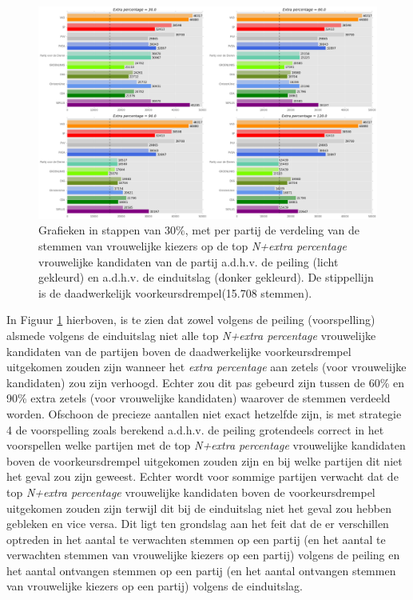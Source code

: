   
\begin{figure}[H]

	\includegraphics[width=\linewidth]	{stemmen_op_vrouwen_topNextrapercentage_samen.png}

			\caption{Grafieken in stappen van 30\%, met per partij de verdeling van de stemmen van vrouwelijke kiezers op de top \textit{N+extra percentage} vrouwelijke kandidaten van de partij a.d.h.v. de peiling (licht gekleurd) en a.d.h.v. de einduitslag (donker gekleurd). De stippellijn is de daadwerkelijk voorkeursdrempel(15.708 stemmen).}

\label{fig:stemmenS4V}
\end{figure}

In Figuur \ref{fig:stemmenS4V} hierboven, is te zien dat zowel volgens de peiling (voorspelling) alsmede volgens de einduitslag niet alle top \textit{N+extra percentage} vrouwelijke kandidaten van de partijen boven de daadwerkelijke voorkeursdrempel uitgekomen zouden zijn wanneer het \textit{extra percentage} aan zetels (voor vrouwelijke kandidaten) zou zijn verhoogd. Echter zou dit pas gebeurd zijn tussen de 60\%  en 90\% extra zetels (voor vrouwelijke kandidaten) waarover de stemmen verdeeld worden. Ofschoon de precieze aantallen niet exact hetzelfde zijn, is met strategie 4 de voorspelling zoals berekend a.d.h.v. de peiling grotendeels correct in het voorspellen welke partijen met de top \textit{N+extra percentage} vrouwelijke kandidaten boven de voorkeursdrempel uitgekomen zouden zijn en bij welke partijen dit niet het geval zou zijn geweest. Echter wordt voor sommige partijen verwacht dat de top \textit{N+extra percentage} vrouwelijke kandidaten boven de voorkeursdrempel uitgekomen zouden zijn terwijl dit bij de einduitslag niet het geval zou hebben gebleken en vice versa. Dit ligt ten grondslag aan het feit dat de er verschillen optreden in het aantal te verwachten stemmen op een partij (en het aantal te verwachten stemmen van vrouwelijke kiezers op een partij) volgens de peiling en het aantal ontvangen stemmen op een partij (en het aantal ontvangen stemmen van vrouwelijke kiezers op een partij) volgens de einduitslag.



